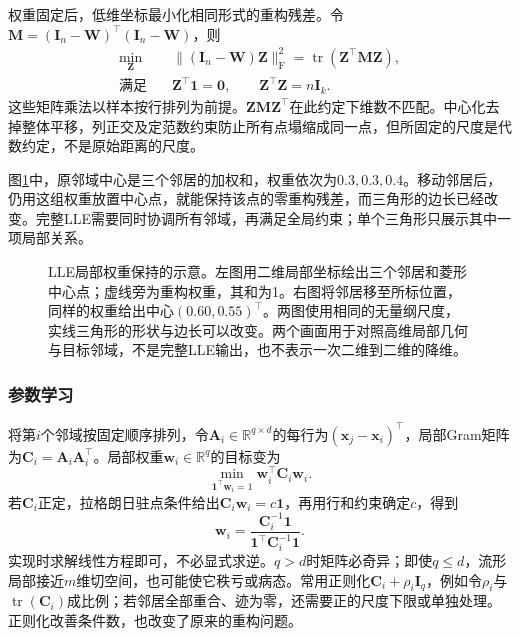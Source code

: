 权重固定后，低维坐标最小化相同形式的重构残差。令$\bm{M}=(\bm{I}_n-\bm{W})^{\top}(\bm{I}_n-\bm{W})$，则
\begin{equation}
  \label{eq:dim-lle-embedding}
  \begin{aligned}
    \min_{\bm{Z}}\quad&
      \lVert(\bm{I}_n-\bm{W})\bm{Z}\rVert_{\mathrm{F}}^2
      =\operatorname{tr}(\bm{Z}^{\top}\bm{M}\bm{Z}),\\
    \text{满足}\quad&
      \bm{Z}^{\top}\bm{1}=\bm{0},\qquad
      \bm{Z}^{\top}\bm{Z}=n\bm{I}_k.
  \end{aligned}
\end{equation}
这些矩阵乘法以样本按行排列为前提。$\bm{Z}\bm{M}\bm{Z}^{\top}$在此约定下维数不匹配。中心化去掉整体平移，列正交及定范数约束防止所有点塌缩成同一点，但所固定的尺度是代数约定，不是原始距离的尺度。

图\ref{fig:dim-lle-weights}中，原邻域中心是三个邻居的加权和，权重依次为$0.3,0.3,0.4$。移动邻居后，仍用这组权重放置中心点，就能保持该点的零重构残差，而三角形的边长已经改变。完整LLE需要同时协调所有邻域，再满足全局约束；单个三角形只展示其中一项局部关系。

\begin{figure}[htbp]
  \centering
  
  \caption{LLE局部权重保持的示意。左图用二维局部坐标绘出三个邻居和菱形中心点；虚线旁为重构权重，其和为1。右图将邻居移至所标位置，同样的权重给出中心$(0.60,0.55)^\top$。两图使用相同的无量纲尺度，实线三角形的形状与边长可以改变。两个画面用于对照高维局部几何与目标邻域，不是完整LLE输出，也不表示一次二维到二维的降维。}
  \label{fig:dim-lle-weights}
\end{figure}

\subsubsection{参数学习}

将第$i$个邻域按固定顺序排列，令$\bm{A}_i\in\mathbb{R}^{q\times d}$的每行为$(\bm{x}_j-\bm{x}_i)^{\top}$，局部Gram矩阵为$\bm{C}_i=\bm{A}_i\bm{A}_i^{\top}$。局部权重$\bm{w}_i\in\mathbb{R}^q$的目标变为
\[
  \min_{\bm{1}^{\top}\bm{w}_i=1}
    \bm{w}_i^{\top}\bm{C}_i\bm{w}_i.
\]
若$\bm{C}_i$正定，拉格朗日驻点条件给出$\bm{C}_i\bm{w}_i=c\bm{1}$，再用行和约束确定$c$，得到
\begin{equation}
  \label{eq:dim-lle-local}
  \bm{w}_i
  =\frac{\bm{C}_i^{-1}\bm{1}}
         {\bm{1}^{\top}\bm{C}_i^{-1}\bm{1}}.
\end{equation}
实现时求解线性方程即可，不必显式求逆。$q>d$时矩阵必奇异；即使$q\leq d$，流形局部接近$m$维切空间，也可能使它秩亏或病态。常用正则化$\bm{C}_i+\rho_i\bm{I}_q$，例如令$\rho_i$与$\operatorname{tr}(\bm{C}_i)$成比例；若邻居全部重合、迹为零，还需要正的尺度下限或单独处理。正则化改善条件数，也改变了原来的重构问题。


